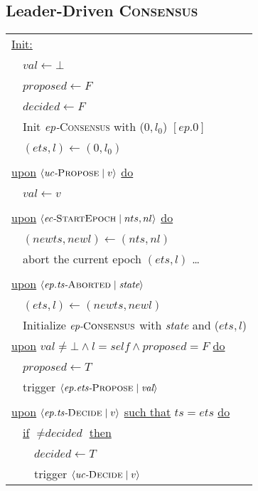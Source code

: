 \documentclass{article}
\begin{document}
\begin{adjustwidth}{2em}{2em}
		\subsection{Leader-Driven \textsc{Consensus}}
		\begin{center}
			\begin{tabular}{l}
				\underline{Init:} \\
				\ \ $val \leftarrow \bot$ \\
				\ \ $\textit{proposed} \leftarrow F$ \\
				\ \ $\textit{decided} \leftarrow F$ \\
				\ \ Init \textit{ep-}\textsc{Consensus} with ($0, l_0$) $[ep.0]$ \\
				\ \ $(ets, l) \leftarrow (0, l_0)$ \\
				\\
				\underline{upon} $\langle \textit{uc-}\textsc{Propose} \mid v \rangle$ \underline{do} \\
				\ \ $\textit{val} \leftarrow v$ \\
				\\
				\underline{upon} $\langle \textit{ec-}\textsc{StartEpoch} \mid nts, nl \rangle$ \underline{do} \\
				\ \ $(newts, newl) \leftarrow (nts, nl)$ \\
				\ \ abort the current epoch $(ets, l)$ \ldots \\
				\\
				\underline{upon} $\langle \textit{ep.ts-}\textsc{Aborted} \mid \textit{state} \rangle$ \\
				\ \ $(ets, l) \leftarrow (newts, newl)$ \\
				\ \ Initialize $\textit{ep-}\textsc{Consensus}$ with \textit{state} and ($ets, l$)
				\\
				\underline{upon} $val \neq \bot \wedge l = \textit{self} \wedge \textit{proposed}=F$ \underline{do}\\
				\ \ $\textit{proposed} \leftarrow T$ \\
				\ \ trigger $\langle \textit{ep.ets-}\textsc{Propose} \mid \textit{val} \rangle$ \\
				\\
				 \underline{upon} $\langle \textit{ep.ts-}\textsc{Decide} \mid v \rangle$ \underline{such that} $ts = ets$ \underline{do} \\
				 \ \ \underline{if} $\neq \textit{decided}$ \underline{then} \\
				 \ \ \ \ $\textit{decided} \leftarrow T$ \\
				 \ \ \ \ trigger $\langle \textit{uc-}\textsc{Decide} \mid v \rangle$
			\end{tabular}
		\end{center}

\end{adjustwidth}
\end{document}
